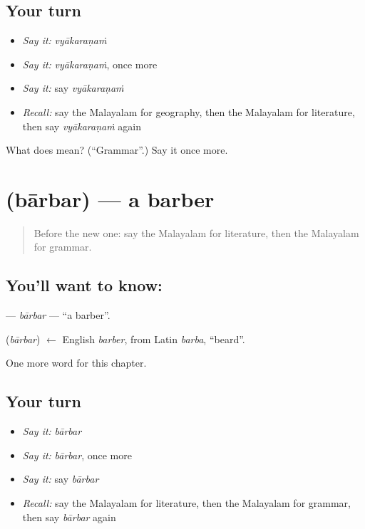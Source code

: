 \subsection*{Your turn}
\begin{itemize}
\raggedright
  \item \emph{Say it:} \emph{vyākaraṇaṁ}
  \item \emph{Say it:} \emph{vyākaraṇaṁ}, once more
  \item \emph{Say it:} say \emph{vyākaraṇaṁ}
  \item \emph{Recall:} say the Malayalam for geography, then the Malayalam for literature, then say \emph{vyākaraṇaṁ} again
\end{itemize}

\begin{tcolorbox}[breakable,colback=teal!4,colframe=teal!35!black,title={Before you move on}]
What does  mean? (\textquotedblleft{}Grammar\textquotedblright{}.) Say it once more.
\end{tcolorbox}
\section[\texorpdfstring{\ml{ബാർബർ} (bārbar)}{ബാർബർ (bārbar)}]{ (bārbar) — a barber}

\label{lesson:ML-C222-barbar}



\begin{quote}
Before the new one: say the Malayalam for literature, then the Malayalam for grammar.
\end{quote}

\subsection*{You'll want to know: }
\textbf{} — \emph{bārbar} — \textquotedblleft{}a barber\textquotedblright{}.

\begin{cousinweb}
\textbf{} (\emph{bārbar}) $\leftarrow$ English \emph{barber}, from Latin \emph{barba}, \textquotedblleft{}beard\textquotedblright{}.
\end{cousinweb}

\begin{grammarlens}[title={What you've built}]
One more word for this chapter.
\end{grammarlens}

\subsection*{Your turn}
\begin{itemize}
\raggedright
  \item \emph{Say it:} \emph{bārbar}
  \item \emph{Say it:} \emph{bārbar}, once more
  \item \emph{Say it:} say \emph{bārbar}
  \item \emph{Recall:} say the Malayalam for literature, then the Malayalam for grammar, then say \emph{bārbar} again
\end{itemize}

